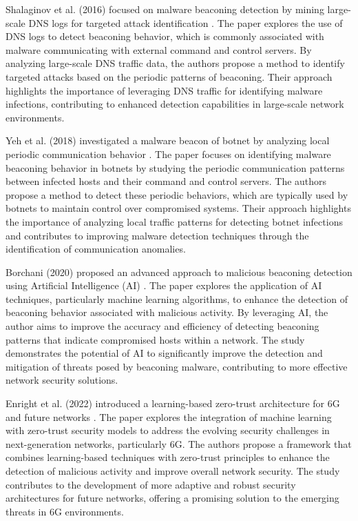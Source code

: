 Shalaginov et al. (2016) focused on malware beaconing detection by mining large-scale DNS logs for targeted attack identification \cite{shalaginov2016malware}. The paper explores the use of DNS logs to detect beaconing behavior, which is commonly associated with malware communicating with external command and control servers. By analyzing large-scale DNS traffic data, the authors propose a method to identify targeted attacks based on the periodic patterns of beaconing. Their approach highlights the importance of leveraging DNS traffic for identifying malware infections, contributing to enhanced detection capabilities in large-scale network environments.

Yeh et al. (2018) investigated a malware beacon of botnet by analyzing local periodic communication behavior \cite{yeh2018malware}. The paper focuses on identifying malware beaconing behavior in botnets by studying the periodic communication patterns between infected hosts and their command and control servers. The authors propose a method to detect these periodic behaviors, which are typically used by botnets to maintain control over compromised systems. Their approach highlights the importance of analyzing local traffic patterns for detecting botnet infections and contributes to improving malware detection techniques through the identification of communication anomalies.

Borchani (2020) proposed an advanced approach to malicious beaconing detection using Artificial Intelligence (AI) \cite{borchani2020advanced}. The paper explores the application of AI techniques, particularly machine learning algorithms, to enhance the detection of beaconing behavior associated with malicious activity. By leveraging AI, the author aims to improve the accuracy and efficiency of detecting beaconing patterns that indicate compromised hosts within a network. The study demonstrates the potential of AI to significantly improve the detection and mitigation of threats posed by beaconing malware, contributing to more effective network security solutions.

Enright et al. (2022) introduced a learning-based zero-trust architecture for 6G and future networks \cite{enright2022learning}. The paper explores the integration of machine learning with zero-trust security models to address the evolving security challenges in next-generation networks, particularly 6G. The authors propose a framework that combines learning-based techniques with zero-trust principles to enhance the detection of malicious activity and improve overall network security. The study contributes to the development of more adaptive and robust security architectures for future networks, offering a promising solution to the emerging threats in 6G environments.


